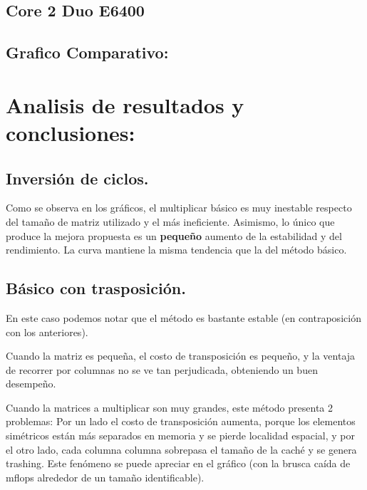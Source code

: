 \documentclass[a4paper,10pt]{article}
\begin{document}
\subsection{Core 2 Duo E6400}


\clearpage

\clearpage

\clearpage

\clearpage

\clearpage

\clearpage

\subsection{Grafico Comparativo: }

\clearpage

\section{Analisis de resultados y conclusiones: }

\subsection{Inversión de ciclos.}

Como se observa en los gráficos, el multiplicar básico es muy inestable respecto del tamaño de matriz utilizado y el más ineficiente. Asimismo, lo único que produce la mejora propuesta es un \textbf{pequeño} aumento de la estabilidad y del rendimiento. La curva mantiene la misma tendencia que la del método básico.

\subsection{Básico con trasposición.}

En este caso podemos notar que el método es bastante estable (en contraposición con los anteriores).

Cuando la matriz es pequeña, el costo de transposición es pequeño, y la ventaja de recorrer por columnas no se ve tan perjudicada, obteniendo un buen desempeño. 

Cuando la matrices a multiplicar son muy grandes, este método presenta 2 problemas: Por un lado el costo de transposición aumenta, porque los elementos simétricos están más separados en memoria y se pierde localidad espacial, y por el otro lado, cada columna columna sobrepasa el tamaño de la caché y se genera trashing. Este fenómeno se puede apreciar en el gráfico (con la brusca caída de mflops alrededor de un tamaño identificable).
\end{document}
